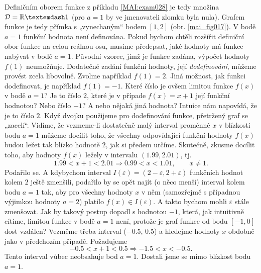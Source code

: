     Definičním oborem funkce z příkladu \ref{MAI:exam028} je tedy množina \(\mathcal{D} = \realset 
    — {1}\) (pro \(a = 1\) by ve jmenovateli zlomku byla nula). Grafem funkce je tedy přímka s 
    „vynechaným“ bodem \([1, 2]\) (obr. \ref{mai_fig017}). V bodě \(a = 1\) funkční hodnota není 
    definována. Pokud bychom chtěli rozšířit definiční obor funkce na celou reálnou osu, musíme 
    předepsat, jaké hodnoty má funkce nabývat v bodě \(a = 1\). Původní vzorec, jímž je funkce 
    zadána, výpočet hodnoty \(f(1)\) neumožňuje. Dodatečné zadání funkční hodnoty, její 
    \emph{dodefinování}, můžeme provést zcela libovolně. Zvolme například \(f(1) = 2\). Jiná 
    možnost, jak funkci dodefinovat, je například \(f(1) =-1\). Které číslo je ovšem limitou funkce 
    \(f(x)\) v bodě \(a = 1\)? Je to číslo \(2\), které je v případe \(f(x) = x+1\) její funkční 
    hodnotou? Nebo číslo \(-1\)? A nebo nějaká jiná hodnota? Intuice nám napovídá, že je to číslo 
    \(2\). Když dvojku použijeme pro dodefinování funkce, přetržený graf se „zacelí“. Vidíme, že 
    vezmeme-li dostatečně malý interval proměnné \(x\) v blízkosti bodu \(a=1\) můžeme docílit 
    toho, že všechny odpovídající funkční hodnoty \(f(x)\) budou ležet tak blízko hodnotě \(2\), 
    jak si předem určíme. Skutečně, zkusme docílit toho, aby hodnoty \(f(x)\) ležely v intervalu 
    \((\num{1.99}, \num{2.01})\), tj.
    \begin{equation*}
      \num{1.99} < x + 1 < \num{2.01} \Rightarrow \num{0.99} < x < \num{1.01},\qquad x\neq1.
    \end{equation*}
    Podařilo se. A kdybychom interval \(I(\varepsilon) = (2 - \varepsilon, 2 + \varepsilon)\) 
    funkčních hodnot kolem \(2\) ještě zmenšili, podařilo by se opět najít (o něco menší) interval 
    kolem bodu \(a = 1\) tak, aby pro všechny hodnoty \(x\) v něm (samozřejmě s případnou výjimkou 
    hodnoty \(a =2\)) platilo \(f(x)\in I(\varepsilon)\). A takto bychom mohli \(\varepsilon\) 
    stále zmenšovat. Jak by takový postup dopadl s hodnotou \(-1\), která, jak intuitivně cítíme, 
    limitou funkce v bodě \(a = 1\) není, protože je graf funkce od bodu \([-1,0]\) dost vzdálen? 
    Vezměme třeba interval (\num{-0.5}, \num{0.5}) a hledejme hodnoty \(x\) obdobně jako v 
    předchozím případě. Požadujeme
    \begin{equation*}
      \num{-0.5} < x + 1 < \num{0.5} \Rightarrow \num{-1.5} < x < \num{-0.5}.
    \end{equation*}
    Tento interval vůbec neobsahuje bod \(a = 1\). Dostali jsme se mimo blízkost bodu \(a = 1\).

